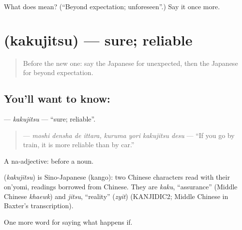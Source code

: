 \begin{tcolorbox}[breakable,colback=teal!4,colframe=teal!35!black,title={Before you move on}]
What does  mean? (\textquotedblleft{}Beyond expectation; unforeseen\textquotedblright{}.) Say it once more.
\end{tcolorbox}
\section[\texorpdfstring{\ja{かくじつ} (kakujitsu)}{かくじつ (kakujitsu)}]{ (kakujitsu) — sure; reliable}

\label{lesson:JA-C520-kakujitsu}



\begin{quote}
Before the new one: say the Japanese for unexpected, then the Japanese for beyond expectation.
\end{quote}

\subsection*{You'll want to know: }
\textbf{} — \emph{kakujitsu} — \textquotedblleft{}sure; reliable\textquotedblright{}.

\begin{quote}
\textbf{   } — \emph{moshi densha de ittara, kuruma yori kakujitsu desu} — \textquotedblleft{}If you go by train, it is more reliable than by car.\textquotedblright{}
\end{quote}

A na-adjective:  before a noun.

\begin{cousinweb}
\textbf{} (\emph{kakujitsu}) is Sino-Japanese (kango): two Chinese characters read with their on'yomi, readings borrowed from Chinese. They are \emph{kaku}, \textquotedblleft{}assurance\textquotedblright{} (Middle Chinese \emph{khaewk}) and \emph{jitsu}, \textquotedblleft{}reality\textquotedblright{} (\emph{zyit}) (KANJIDIC2; Middle Chinese in Baxter's transcription).
\end{cousinweb}

\begin{grammarlens}[title={What you've built}]
One more word for saying what happens if.
\end{grammarlens}

